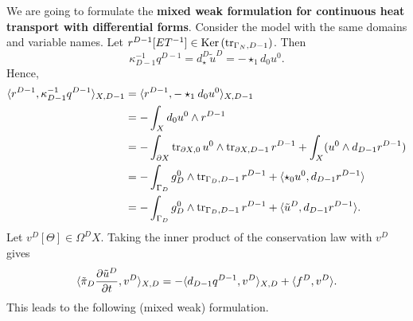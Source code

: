 \begin{discussion}
  We are going to formulate the \textbf{mixed weak formulation for continuous
  heat transport with differential forms}.
  Consider the model
  with the same domains and variable names.
  Let $r^{D - 1} [E T^{-1}] \in \mathop{\rm Ker}\nolimits \left(\mathop{\rm tr}\nolimits_{\Gamma_N, D - 1}\right)$.
  Then
  \begin{equation}
    \kappa_{D - 1}^{-1} q^{D - 1} = d_\star^D \tilde{u}^D = - \star_1 d_0 u^0.
  \end{equation}
  Hence,
  \begin{equation}
    \begin{split}
      \langle r^{D - 1},\kappa_{D - 1}^{-1} q^{D - 1}\rangle_{X, D - 1}
      & = \langle r^{D - 1},- \star_1 d_0 u^0\rangle_{X, D - 1} \\
      & = - \int_X d_0 u^0 \wedge r^{D - 1} \\
      & = - \int_{\partial X}
        \mathop{\rm tr}\nolimits_{\partial X, 0} u^0 \wedge \mathop{\rm tr}\nolimits_{\partial X, D - 1} r^{D - 1}
        + \int_{X} (u^0 \wedge d_{D - 1} r^{D - 1}) \\
      & = - \int_{\Gamma_D} g_D^0 \wedge \mathop{\rm tr}\nolimits_{\Gamma_D, D - 1} r^{D - 1}
        + \langle\star_0 u^0,d_{D - 1} r^{D - 1}\rangle \\
      & = - \int_{\Gamma_D} g_D^0 \wedge \mathop{\rm tr}\nolimits_{\Gamma_D, D - 1} r^{D - 1}
        + \langle\tilde{u}^D,d_{D - 1} r^{D - 1}\rangle.
    \end{split}
  \end{equation}
  Let $v^D [\Theta] \in \Omega^D X$.
  Taking the inner product of the conservation law with $v^D$ gives
  \begin{equation}
   \langle\tilde{\pi}_D \frac{\partial \tilde{u}^D}{\partial t},v^D\rangle_{X, D}
    = - \langle d_{D - 1} q^{D - 1},v^D\rangle_{X, D} + \langle f^D,v^D\rangle.
  \end{equation}
  This leads to the following (mixed weak) formulation.
\end{discussion}
